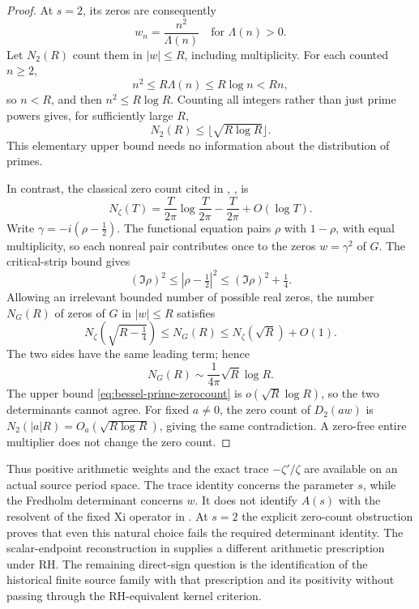 \begin{proof}
At \(s=2\), its zeros are consequently
\[
 w_n=\frac{n^2}{\Lambda(n)}
 \quad\text{for }\Lambda(n)>0.
\]
Let \(N_2(R)\) count them in \(|w|\le R\), including
multiplicity.  For each counted \(n\ge2\),
\[
 n^2\le R\Lambda(n)\le R\log n<Rn,
\]
so \(n<R\), and then \(n^2\le R\log R\).  Counting all integers
rather than just prime powers gives, for sufficiently large \(R\),
\begin{equation}\label{eq:bessel-prime-zerocount}
 N_2(R)\le\lfloor\sqrt{R\log R}\rfloor.
\end{equation}
This elementary upper bound needs no information about the
distribution of primes.

In contrast, the classical zero count cited in ,
\cite[Theorem 9.4, (9.4.3), p.~214]{titch}, is
\[
 N_\zeta(T)=\frac{T}{2\pi}\log\frac{T}{2\pi}
            -\frac{T}{2\pi}+O(\log T).
\]
Write \(\gamma=-i(\rho-\tfrac12)\).  The functional equation
pairs \(\rho\) with \(1-\rho\), with equal multiplicity, so each
nonreal pair contributes once to the zeros \(w=\gamma^2\) of
\(G\).  The critical-strip bound gives
\[
 (\Im\rho)^2\le|\rho-\tfrac12|^2
             \le(\Im\rho)^2+\tfrac14.
\]
Allowing an irrelevant bounded number of possible real zeros,
the number \(N_G(R)\) of zeros of \(G\) in \(|w|\le R\) satisfies
\[
 N_\zeta(\sqrt{R-\tfrac14})\le N_G(R)
 \le N_\zeta(\sqrt R)+O(1).
\]
The two sides have the same leading term; hence
\begin{equation}\label{eq:bessel-Xi-zerocount}
 N_G(R)\sim\frac{1}{4\pi}\sqrt R\log R.
\end{equation}
The upper bound \eqref{eq:bessel-prime-zerocount} is
\(o(\sqrt R\log R)\), so the two determinants cannot agree.
For fixed \(a\ne0\), the zero count of \(D_2(aw)\) is
\(N_2(|a|R)=O_a(\sqrt{R\log R})\), giving the same contradiction.
A zero-free entire multiplier does not change the zero count.
\end{proof}

Thus positive arithmetic weights and the exact trace
\(-\zeta'/\zeta\) are available on an actual source period space.
The trace identity concerns the parameter \(s\), while the
Fredholm determinant concerns \(w\).  It does not identify
\(A(s)\) with the resolvent of the fixed Xi operator in
.  At \(s=2\) the explicit zero-count obstruction
proves that even this natural choice fails the required
determinant identity.  The scalar-endpoint reconstruction in
 supplies a different arithmetic prescription under
RH. The remaining direct-sign question is the identification of
the historical finite source family with that prescription and
its positivity without passing through the RH-equivalent kernel
criterion.
